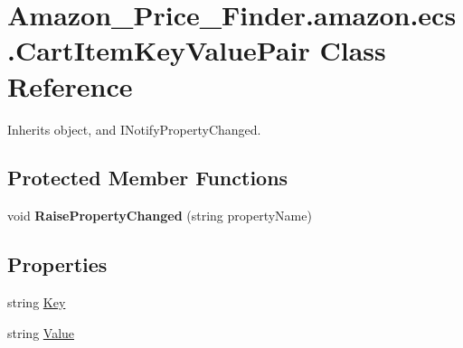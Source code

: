 \hypertarget{class_amazon___price___finder_1_1amazon_1_1ecs_1_1_cart_item_key_value_pair}{\section{Amazon\-\_\-\-Price\-\_\-\-Finder.\-amazon.\-ecs.\-Cart\-Item\-Key\-Value\-Pair Class Reference}
\label{class_amazon___price___finder_1_1amazon_1_1ecs_1_1_cart_item_key_value_pair}
}


 




Inherits object, and I\-Notify\-Property\-Changed.

\subsection*{Protected Member Functions}
\begin{DoxyCompactItemize}
\item 
\hypertarget{class_amazon___price___finder_1_1amazon_1_1ecs_1_1_cart_item_key_value_pair_a61ea4230dc45fab3099f162e059593b5}{void {\bfseries Raise\-Property\-Changed} (string property\-Name)}\label{class_amazon___price___finder_1_1amazon_1_1ecs_1_1_cart_item_key_value_pair_a61ea4230dc45fab3099f162e059593b5}

\end{DoxyCompactItemize}
\subsection*{Properties}
\begin{DoxyCompactItemize}
\item 
\hypertarget{class_amazon___price___finder_1_1amazon_1_1ecs_1_1_cart_item_key_value_pair_ab11d6bca571ef5f704ebac603517fb85}{string \hyperlink{class_amazon___price___finder_1_1amazon_1_1ecs_1_1_cart_item_key_value_pair_ab11d6bca571ef5f704ebac603517fb85}{Key}}\label{class_amazon___price___finder_1_1amazon_1_1ecs_1_1_cart_item_key_value_pair_ab11d6bca571ef5f704ebac603517fb85}

\begin{DoxyCompactList}\small\item\em \end{DoxyCompactList}\item 
\hypertarget{class_amazon___price___finder_1_1amazon_1_1ecs_1_1_cart_item_key_value_pair_ab1d647cbd3a6fc169417a10249d5e522}{string \hyperlink{class_amazon___price___finder_1_1amazon_1_1ecs_1_1_cart_item_key_value_pair_ab1d647cbd3a6fc169417a10249d5e522}{Value}}\label{class_amazon___price___finder_1_1amazon_1_1ecs_1_1_cart_item_key_value_pair_ab1d647cbd3a6fc169417a10249d5e522}

\begin{DoxyCompactList}\small\item\em \end{DoxyCompactList}\end{DoxyCompactItemize}
